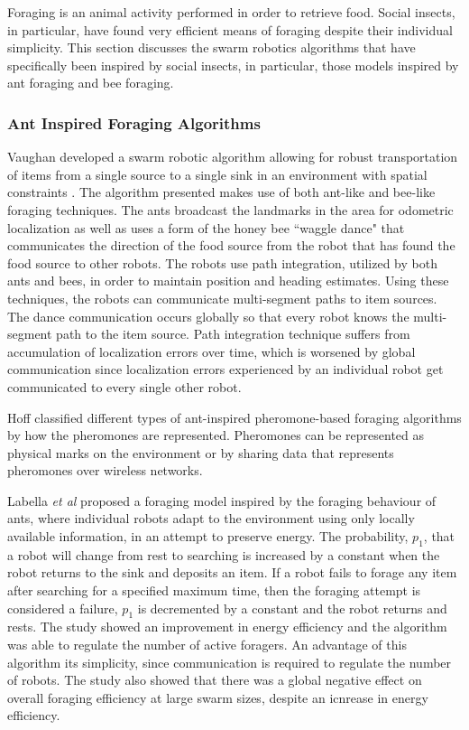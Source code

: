 Foraging is an animal activity performed in order to retrieve food. Social insects, in particular, have found very efficient means of foraging despite their individual simplicity. This section discusses the swarm robotics algorithms that have specifically been inspired by social insects, in particular, those models inspired by ant foraging and bee foraging. 


\subsubsection{Ant Inspired Foraging Algorithms}
\label{sec:second:natureinspired:ant}

Vaughan developed a swarm robotic algorithm allowing for robust transportation of items from a single source to a single sink in an environment with spatial constraints \cite{vaughan2000blazing}. The algorithm presented makes use of both ant-like and bee-like foraging techniques. The ants broadcast the landmarks in the area for odometric localization as well as uses a form of the  honey bee ``waggle dance" that communicates the direction of the food source from the robot that has found the food source to other robots. The robots use path integration, utilized by both ants and bees, in order to maintain position and heading estimates. Using these techniques, the robots can communicate multi-segment paths to item sources. The dance communication occurs globally so that every robot knows the multi-segment path to the item source. Path integration technique suffers from accumulation of localization errors over time, which is worsened by global communication since localization errors experienced by an individual robot get communicated to every single other robot.


Hoff \cite{hoff2010two} classified different types of ant-inspired pheromone-based foraging algorithms by how the pheromones are represented. Pheromones can be represented as physical marks on the environment \cite{fujisawa2008communication} or by sharing data that represents pheromones over wireless networks.

Labella \textit{et al} \cite{labella2006division} proposed a foraging model inspired by the foraging behaviour of ants, where individual robots adapt to the environment using only locally available information, in an attempt to preserve energy. The probability, $p_1$, that a robot will change from rest to searching is increased by a constant when the robot returns to the sink and deposits an item. If a robot fails to forage any item after searching for a specified maximum time, then the foraging attempt is considered a failure, $p_1$ is decremented by a constant and the robot returns and rests. The study showed an improvement in energy efficiency and the algorithm was able to regulate the number of active foragers. An advantage of this algorithm its simplicity, since communication is required to regulate the number of robots. The study also showed that there was a global negative effect on overall foraging efficiency at large swarm sizes, despite an icnrease in energy efficiency.


